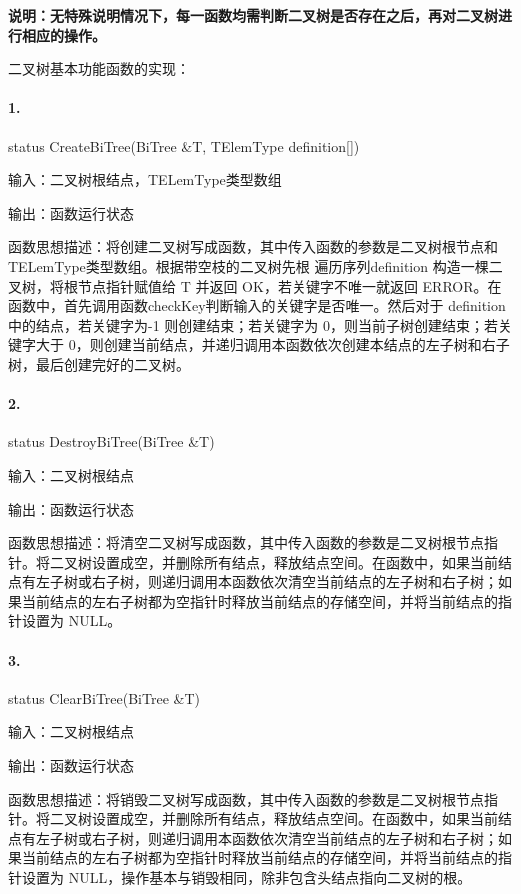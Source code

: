 \documentclass[supercite]{Experimental_Report}
\theoremstyle{definition}
\begin{document}
\textbf{说明：无特殊说明情况下，每一函数均需判断二叉树是否存在之后，再对二叉树进行相应的操作。}

\setcounter{paragraph}{0}

二叉树基本功能函数的实现：

\paragraph{ 1.} status CreateBiTree(BiTree \&T, TElemType definition[])

输入：二叉树根结点，TELemType类型数组

输出：函数运行状态

函数思想描述：将创建二叉树写成函数，其中传入函数的参数是二叉树根节点和TELemType类型数组。根据带空枝的二叉树先根
遍历序列definition 构造一棵二叉树，将根节点指针赋值给 T 并返回 OK，若关键字不唯一就返回 ERROR。在函数中，首先调用函数checkKey判断输入的关键字是否唯一。然后对于 definition 中的结点，若关键字为-1 则创建结束；若关键字为 0，则当前子树创建结束；若关键字大于 0，则创建当前结点，并递归调用本函数依次创建本结点的左子树和右子树，最后创建完好的二叉树。

\paragraph{ 2.} status DestroyBiTree(BiTree \&T)
    
输入：二叉树根结点

输出：函数运行状态

函数思想描述：将清空二叉树写成函数，其中传入函数的参数是二叉树根节点指针。将二叉树设置成空，并删除所有结点，释放结点空间。在函数中，如果当前结点有左子树或右子树，则递归调用本函数依次清空当前结点的左子树和右子树；如果当前结点的左右子树都为空指针时释放当前结点的存储空间，并将当前结点的指针设置为 NULL。

\paragraph{ 3.}status ClearBiTree(BiTree \&T)
    
输入：二叉树根结点

输出：函数运行状态

函数思想描述：将销毁二叉树写成函数，其中传入函数的参数是二叉树根节点指针。将二叉树设置成空，并删除所有结点，释放结点空间。在函数中，如果当前结点有左子树或右子树，则递归调用本函数依次清空当前结点的左子树和右子树；如果当前结点的左右子树都为空指针时释放当前结点的存储空间，并将当前结点的指针设置为 NULL，操作基本与销毁相同，除非包含头结点指向二叉树的根。
\end{document}
